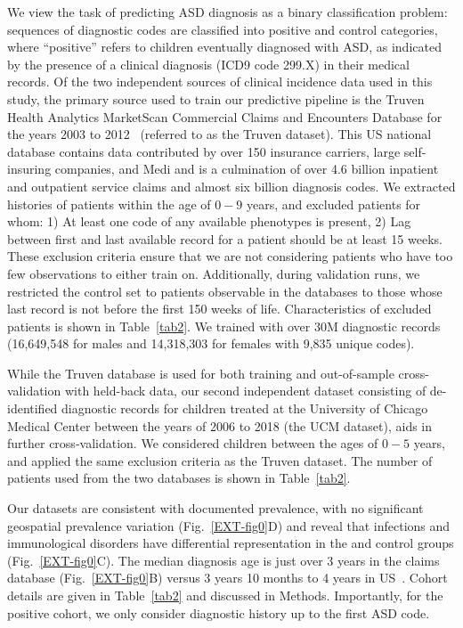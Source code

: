 \documentclass[onecolumn,10pt]{IEEEtran}
\begin{document}
We view the task of predicting  ASD diagnosis   as a binary classification problem: sequences of diagnostic codes are classified into positive and control categories, where ``positive'' refers to children eventually diagnosed with ASD, as indicated by the presence of a clinical diagnosis (ICD9 code 299.X) in their medical records. Of the two independent sources of clinical incidence data used in this study,  the primary source used to train our predictive pipeline  is the Truven Health Analytics MarketScan\textsuperscript{\textregistered} Commercial Claims and Encounters Database for the years 2003 to 2012~\cite{hansen2017truven} (referred to  as the Truven dataset). This US national database contains data contributed by over 150 insurance carriers, large self-insuring companies, and Medi and is a culmination of over  4.6 billion inpatient and outpatient service claims and  almost six billion diagnosis codes. We extracted histories of patients within the age of $0-9$ years, and excluded  patients for whom:  1) At least one code of any available phenotypes is present, 2) Lag between first and last available record for a patient should be at least 15 weeks. These exclusion criteria ensure that we are not considering patients who have too few observations to either train on. Additionally, during validation runs,  we restricted the control set to patients observable in the databases to those whose last record is not before the first 150 weeks of life. Characteristics of excluded patients is shown in Table~\ref{tab2}. We trained with over  30M diagnostic records (16,649,548 for males and  14,318,303  for females with 9,835 unique  codes).

While the Truven database is used for both training and out-of-sample cross-validation with held-back  data, our second independent dataset  consisting of de-identified diagnostic records for children treated at the University of Chicago Medical Center between the years of 2006 to 2018 (the UCM dataset), aids in further cross-validation. We considered children between the ages of $0-5$ years, and  applied the same exclusion criteria as the Truven dataset.  The  number of  patients used from the two databases is shown in Table~\ref{tab2}.

Our datasets are consistent with documented prevalence, with no significant geospatial prevalence variation (Fig.~\ref{EXT-fig0}D) and reveal that  infections and immunological disorders have differential representation in the \treatment and control groups (Fig.~\ref{EXT-fig0}C).  The  median diagnosis age is  just over  3 years in the claims database (Fig.~\ref{EXT-fig0}B)  versus 3 years 10 months to 4 years  in US~\cite{pmid29701730}. Cohort details are given in Table~\ref{tab2} and discussed in Methods. Importantly, for the positive cohort, we only consider diagnostic history up to the first ASD code.
\end{document}
